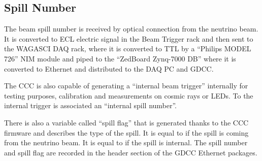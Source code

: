 \subsection{Spill Number}
The beam spill number is received by optical connection from the neutrino
beam. It is converted to ECL electric signal in the Beam Trigger rack and then
sent to the WAGASCI DAQ rack, where it is converted to TTL by a ``Philips MODEL
726'' NIM module and piped to the ``ZedBoard Zynq-7000 DB'' where it is
converted to Ethernet and distributed to the DAQ PC and GDCC.

The CCC is also capable of generating a ``internal beam trigger'' internally for
testing purposes, calibration and measurements on cosmic rays or LEDs. To the
internal trigger is associated an ``internal spill number''.

There is also a variable called ``spill flag'' that is generated thanks to the
CCC firmware and describes the type of the spill. It is equal to
 if the spill is coming from the neutrino beam. It is equal to
 if the spill is internal. The spill number and spill flag are
recorded in the header section of the GDCC Ethernet packages.

